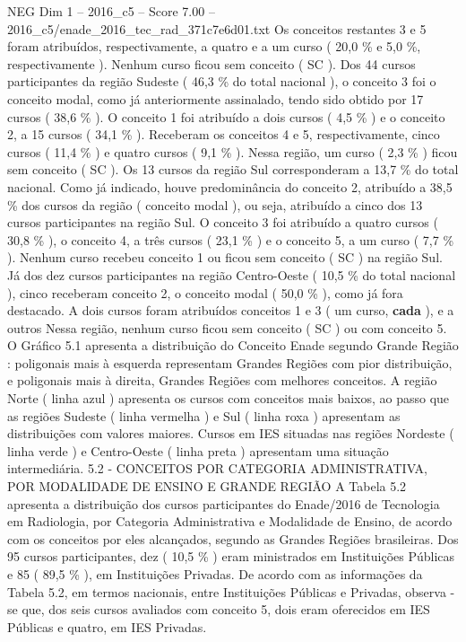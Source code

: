 \begin{textsample}{NEG Dim 1 – 2016\_c5 – Score 7.00 – 2016\_c5/enade\_2016\_tec\_rad\_371c7e6d01.txt}
Os conceitos restantes 3 e 5 foram atribuídos, respectivamente, a quatro e a um curso ( 20,0 \% e 5,0 \%, respectivamente ).
Nenhum curso ficou sem conceito ( SC ).
Dos 44 cursos participantes da região Sudeste ( 46,3 \% do total nacional ), o conceito 3 foi o conceito modal, como já anteriormente assinalado, tendo sido obtido por 17 cursos ( 38,6 \% ).
O conceito 1 foi atribuído a dois cursos ( 4,5 \% ) e o conceito 2, a 15 cursos ( 34,1 \% ).
Receberam os conceitos 4 e 5, respectivamente, cinco cursos ( 11,4 \% ) e quatro cursos ( 9,1 \% ).
Nessa região, um curso ( 2,3 \% ) ficou sem conceito ( SC ).
Os 13 cursos da região Sul corresponderam a 13,7 \% do total nacional.
Como já indicado, houve predominância do conceito 2, atribuído a 38,5 \% dos cursos da região ( conceito modal ), ou seja, atribuído a cinco dos 13 cursos participantes na região Sul.
O conceito 3 foi atribuído a quatro cursos ( 30,8 \% ), o conceito 4, a três cursos ( 23,1 \% ) e o conceito 5, a um curso ( 7,7 \% ).
Nenhum curso recebeu conceito 1 ou ficou sem conceito ( SC ) na região Sul.
Já dos dez cursos participantes na região Centro-Oeste ( 10,5 \% do total nacional ), cinco receberam conceito 2, o conceito modal ( 50,0 \% ), como já fora destacado.
A dois cursos foram atribuídos conceitos 1 e 3 ( um curso, \textbf{cada} ), e a outros Nessa região, nenhum curso ficou sem conceito ( SC ) ou com conceito 5.
O Gráfico 5.1 apresenta a distribuição do Conceito Enade segundo Grande Região : poligonais mais à esquerda representam Grandes Regiões com pior distribuição, e poligonais mais à direita, Grandes Regiões com melhores conceitos.
A região Norte ( linha azul ) apresenta os cursos com conceitos mais baixos, ao passo que as regiões Sudeste ( linha vermelha ) e Sul ( linha roxa ) apresentam as distribuições com valores maiores.
Cursos em IES situadas nas regiões Nordeste ( linha verde ) e Centro-Oeste ( linha preta ) apresentam uma situação intermediária. 5.2 - CONCEITOS POR CATEGORIA ADMINISTRATIVA, POR MODALIDADE DE ENSINO E GRANDE REGIÃO A Tabela 5.2 apresenta a distribuição dos cursos participantes do Enade/2016 de Tecnologia em Radiologia, por Categoria Administrativa e Modalidade de Ensino, de acordo com os conceitos por eles alcançados, segundo as Grandes Regiões brasileiras.
Dos 95 cursos participantes, dez ( 10,5 \% ) eram ministrados em Instituições Públicas e 85 ( 89,5 \% ), em Instituições Privadas.
De acordo com as informações da Tabela 5.2, em termos nacionais, entre Instituições Públicas e Privadas, observa -se que, dos seis cursos avaliados com conceito 5, dois eram oferecidos em IES Públicas e quatro, em IES Privadas.

\end{textsample}
